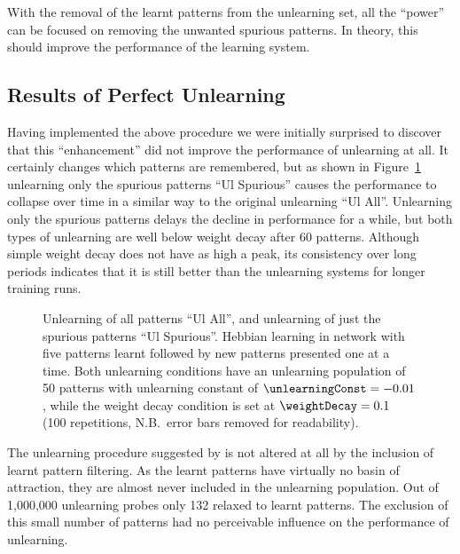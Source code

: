 With the removal of the learnt patterns from the unlearning set, all the ``power'' can be focused on removing the unwanted spurious patterns. In theory, this should improve the performance of the learning system.

\subsection{Results of Perfect Unlearning}

Having implemented the above procedure we were initially surprised to discover that this ``enhancement'' did not improve the performance of unlearning at all.  It certainly changes which patterns are remembered, but as shown in Figure~\ref{fig:enhancedULpure} unlearning only the spurious patterns ``Ul Spurious'' causes the performance to collapse over time in a similar way to the original unlearning ``Ul All''.  Unlearning only the spurious patterns delays the decline in performance for a while, but both types of unlearning are well below weight decay after 60 patterns.  Although simple weight decay does not have as high a peak, its consistency over long periods indicates that it is still better than the unlearning systems for longer training runs.
 
\begin{figure}[tbp]
	\small
	\begin{center}
	
	\end{center}
	\caption{Unlearning of all patterns ``Ul All'', and unlearning of just the spurious patterns ``Ul Spurious''.  Hebbian learning in  network with five patterns learnt followed by new patterns presented one at a time.  Both unlearning conditions have an unlearning population of 50 patterns with unlearning constant of $\unlearningConst = -0.01$, while the weight decay condition is set at $\weightDecay = 0.1$ (100 repetitions, N.B.\ error bars removed for readability).} 
	\label{fig:enhancedULpure}
\end{figure}

The unlearning procedure suggested by \citet{vanHemmen1997} is not altered at all by the inclusion of learnt pattern filtering.  As the learnt patterns have virtually no basin of attraction, they are almost never included in the unlearning population.  Out of 1,000,000 unlearning probes only 132 relaxed to learnt patterns.  The exclusion of this small number of patterns had no perceivable influence on the performance of unlearning.


